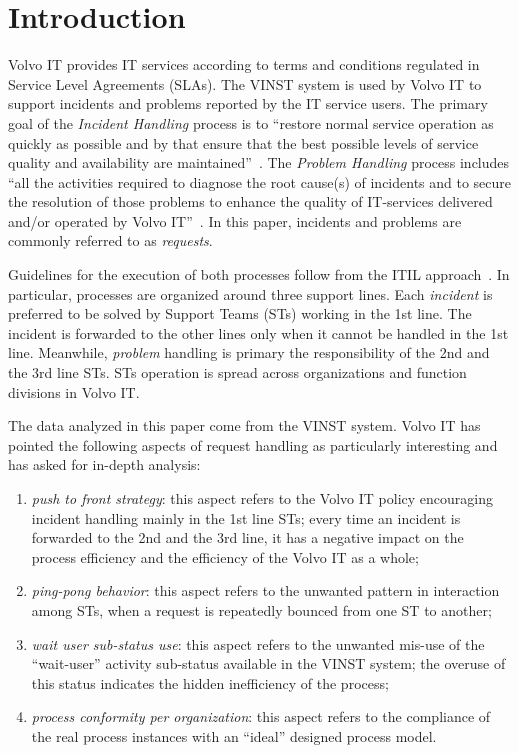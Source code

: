 \documentclass[lnbip]{svmultln}
\begin{document}
\section{Introduction}
%
Volvo IT provides IT services according to terms and conditions regulated in Service Level Agreements (SLAs). The VINST system is used by Volvo IT to support incidents and problems reported by the IT service users. The primary goal of the \emph{Incident Handling} process is to ``restore normal service operation as quickly as possible and by that ensure that the best possible levels of service quality and availability are maintained''~\cite{entry1}. The \emph{Problem Handling} process includes ``all the activities required to diagnose the root cause(s) of incidents and to secure the resolution of those problems to enhance the quality of IT-services delivered and/or operated by Volvo IT''~\cite{entry1}. In this paper, incidents and problems are commonly referred to as \emph{requests}. 

Guidelines for the execution of both processes follow from the ITIL approach~\cite{entry2}. In particular, processes are organized around three support lines. Each \emph{incident} is preferred to be solved by Support Teams (STs) working in the 1st line. The incident is forwarded to the other lines only when it cannot be handled in the 1st line. Meanwhile, \emph{problem} handling is primary the responsibility of the 2nd and the 3rd line STs. STs operation is spread across organizations and function divisions in Volvo IT.

The data analyzed in this paper come from the VINST system. Volvo IT has pointed the following aspects of request handling as particularly interesting and has asked for in-depth analysis:
\begin{enumerate}
	\item \emph{push to front strategy}: this aspect refers to the Volvo IT policy encouraging incident handling mainly in the 1st line STs; every time an incident is forwarded to the 2nd and the 3rd line, it has a negative impact on the process efficiency and the efficiency of the Volvo IT as a whole;
	\item \emph{ping-pong behavior}: this aspect refers to the unwanted pattern in interaction among STs, when a request is repeatedly bounced from one ST to another;
	\item \emph{wait user sub-status use}: this aspect refers to the unwanted mis-use of the ``wait-user'' activity sub-status available in the VINST system; the overuse of this status indicates the hidden inefficiency of the process;
	\item \emph{process conformity per organization}: this aspect refers to the compliance of the real process instances with an ``ideal'' designed process model.
\end{enumerate}
\end{document}
